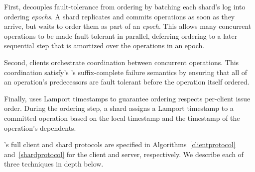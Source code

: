 First, \sys{} decouples fault-tolerance from ordering by batching each shard's
log into ordering \textit{epochs}. A \sys{} shard replicates and commits
operations as soon as they arrive, but waits to order them as part of an
\textit{epoch}. This allows many concurrent operations to be made fault tolerant
in parallel, deferring ordering to a later sequential step that is amortized
over the operations in an epoch.

Second, \sys{} clients orchestrate coordination between concurrent operations.
This coordination satisfy's \MDL{}'s suffix-complete failure semantics by
ensuring that all of an operation's predecessors are fault tolerant before the
operation itself ordered.


Finally, \sys{} uses Lamport timestamps to guarantee ordering respects
per-client issue order. During the ordering step, a shard assigns a Lamport
timestamp to a committed operation based on the local timestamp and the
timestamp of the operation's dependents.

\sys{}'s full client and shard protocols are specified in
Algorithms~\ref{clientprotocol} and~\ref{shardprotocol} for the client and
server, respectively. We describe each of three techniques in depth below.



